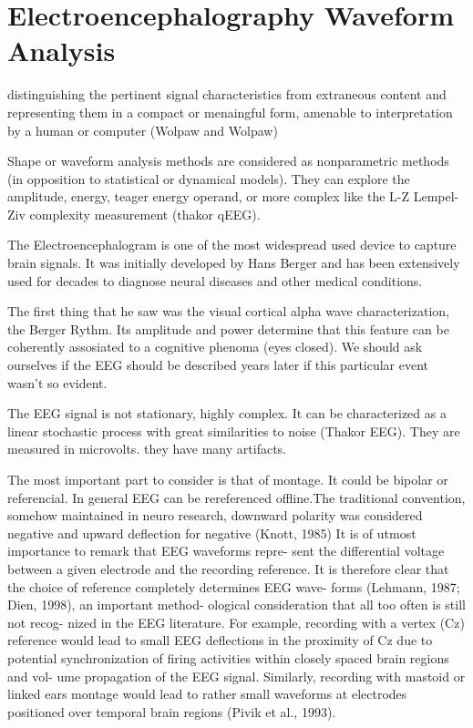 \documentclass[sensors,article,submit,moreauthors,pdftex,10pt,a4paper]{mdpi}
\begin{document}
\section{Electroencephalography Waveform Analysis}

distinguishing the pertinent signal characteristics from extraneous content and representing them in a compact or menaingful form, amenable to interpretation by a human or computer (Wolpaw and Wolpaw)


Shape or waveform analysis methods are considered as nonparametric methods (in opposition to statistical or dynamical models).  They can explore the amplitude, energy, teager energy operand, or more complex like the L-Z Lempel-Ziv complexity measurement (thakor qEEG).


The Electroencephalogram is one of the most widespread used device to capture brain signals.  It was initially developed by Hans Berger and has been extensively used for decades to diagnose neural diseases and other medical conditions.

The first thing that he saw was the visual cortical alpha wave characterization, the Berger Rythm.  Its amplitude and power determine that this feature can be coherently assosiated to a cognitive phenoma (eyes closed).  We should ask ourselves if the EEG should be described years later if this particular event wasn't so evident.

The EEG signal is not stationary, highly complex.  It can be characterized as a linear stochastic process with great similarities to noise (Thakor EEG).  They are measured in microvolts.
they have many artifacts.

The most important part to consider is that of montage.  It could be bipolar or referencial.  In general EEG can be rereferenced offline.The traditional convention, somehow maintained in neuro research, downward polarity was considered negative and upward deflection for negative (Knott, 1985)  It is of utmost importance to remark that  EEG waveforms repre- sent the differential voltage between a given electrode and the recording reference. It is therefore clear that the choice of reference completely determines EEG wave- forms (Lehmann, 1987; Dien, 1998), an important method- ological consideration that all too often is still not recog- nized in the EEG literature. For example, recording with a vertex (Cz) reference would lead to small EEG deflections in the proximity of Cz due to potential synchronization of firing activities within closely spaced brain regions and vol- ume propagation of the EEG signal. Similarly, recording with mastoid or linked ears montage would lead to rather small waveforms at electrodes positioned over temporal brain regions (Pivik et al., 1993).
\end{document}
